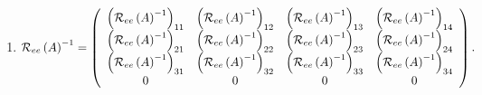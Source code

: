\documentclass[aps,preprint]{revtex4}%
\begin{document}
\begin{enumerate}
\begin{enumerate}
\item
\begin{equation}
\mathcal{R}_{ee}\left(  A\right)  ^{-1}=\left(
\begin{array}
[c]{cccc}%
\left(  \mathcal{R}_{ee}\left(  A\right)  ^{-1}\right)  _{11} & \left(
\mathcal{R}_{ee}\left(  A\right)  ^{-1}\right)  _{12} & \left(  \mathcal{R}%
_{ee}\left(  A\right)  ^{-1}\right)  _{13} & \left(  \mathcal{R}_{ee}\left(
A\right)  ^{-1}\right)  _{14}\\
\left(  \mathcal{R}_{ee}\left(  A\right)  ^{-1}\right)  _{21} & \left(
\mathcal{R}_{ee}\left(  A\right)  ^{-1}\right)  _{22} & \left(  \mathcal{R}%
_{ee}\left(  A\right)  ^{-1}\right)  _{23} & \left(  \mathcal{R}_{ee}\left(
A\right)  ^{-1}\right)  _{24}\\
\left(  \mathcal{R}_{ee}\left(  A\right)  ^{-1}\right)  _{31} & \left(
\mathcal{R}_{ee}\left(  A\right)  ^{-1}\right)  _{32} & \left(  \mathcal{R}%
_{ee}\left(  A\right)  ^{-1}\right)  _{33} & \left(  \mathcal{R}_{ee}\left(
A\right)  ^{-1}\right)  _{34}\\
0 & 0 & 0 & 0
\end{array}
\right)  .
\end{equation}



\end{enumerate}
\end{enumerate}
\end{document}
